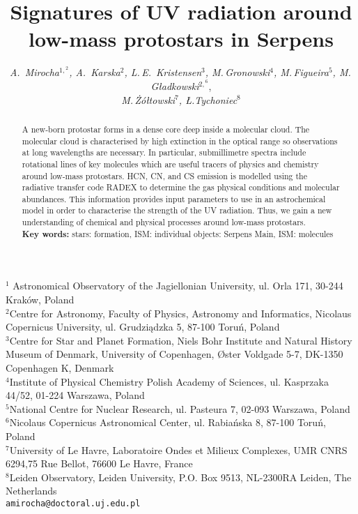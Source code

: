 \documentclass[a4paper]{article}
\begin{document}
\fontsize{11}{11}\selectfont %
\title{Signatures of UV radiation around low-mass protostars in Serpens}
\author{\textsl{A.~Mirocha$^{1,}^{2}$, A.~Karska$^{2}$, L.\,E.~Kristensen$^{3}$, M.\,Gronowski$^{4}$, M.\,Figueira$^{5}$, M.\, Gładkowski$^{2,}^{6}$}, \\  \textsl{M.\,Żółtowski$^{7}$, Ł.Tychoniec$^{8}$}}
\date{\vspace*{-6ex}}
\maketitle
\begin{center} {\small $^{1}$ Astronomical Observatory of the Jagiellonian University, ul. Orla 171, 30-244 Kraków, Poland\\
$^{2}$Centre for Astronomy, Faculty of Physics, Astronomy and Informatics, Nicolaus Copernicus University, ul. Grudziądzka 5, 87-100 Toruń, Poland\\
$^{3}$Centre for Star and Planet Formation, Niels Bohr Institute and Natural History Museum of Denmark, University of Copenhagen, Øster Voldgade 5-7, DK-1350 Copenhagen K, Denmark\\
$^{4}$Institute of Physical Chemistry Polish Academy of Sciences, ul. Kasprzaka 44/52, 01-224 Warszawa, Poland\\
$^{5}$National Centre for Nuclear Research, ul. Pasteura 7, 02-093 Warszawa, Poland\\
$^{6}$Nicolaus Copernicus Astronomical Center, ul. Rabiańska 8, 87-100 Toruń, Poland\\
$^{7}$University of Le Havre, Laboratoire Ondes et Milieux Complexes, UMR CNRS 6294,75 Rue Bellot, 76600 Le Havre, France\\
$^{8}$Leiden Observatory, Leiden University, P.O. Box 9513, NL-2300RA Leiden, The Netherlands\\
{\tt amirocha@doctoral.uj.edu.pl}}
\end{center}

\begin{abstract}
A new-born protostar forms in a dense core deep inside a molecular cloud. The molecular cloud is characterised by high extinction in the optical range so observations at long wavelengths are necessary. In particular, submillimetre spectra include rotational lines of key molecules which are useful tracers of physics and chemistry around low-mass protostars. HCN, CN, and CS emission is modelled using the radiative transfer code RADEX to determine the gas physical conditions and molecular abundances. This information provides input parameters to use in an astrochemical model in order to characterise the strength of the UV radiation. Thus, we gain a new understanding of chemical and physical processes around low-mass protostars.\\[1ex]
{\bf Key words:} stars: formation, ISM: individual objects: Serpens Main, ISM: molecules
\end{abstract}
\end{document}
